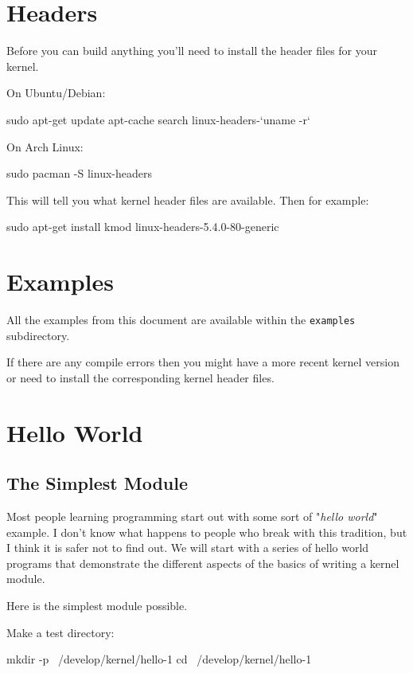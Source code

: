 \documentclass[10pt, oneside]{book}
\begin{document}
\section{Headers}
\label{sec:headers}
Before you can build anything you'll need to install the header files for your kernel.

On Ubuntu/Debian:
\begin{codebash}
sudo apt-get update
apt-cache search linux-headers-`uname -r`
\end{codebash}

On Arch Linux:
\begin{codebash}
sudo pacman -S linux-headers
\end{codebash}

This will tell you what kernel header files are available.
Then for example:
\begin{codebash}
sudo apt-get install kmod linux-headers-5.4.0-80-generic
\end{codebash}

\section{Examples}
\label{sec:examples}
All the examples from this document are available within the \verb|examples| subdirectory.

If there are any compile errors then you might have a more recent kernel version or need to install the corresponding kernel header files.

\section{Hello World}
\label{sec:helloworld}
\subsection{The Simplest Module}
\label{sec:org2d3e245}
Most people learning programming start out with some sort of "\emph{hello world}" example.
I don't know what happens to people who break with this tradition, but I think it is safer not to find out.
We will start with a series of hello world programs that demonstrate the different aspects of the basics of writing a kernel module.

Here is the simplest module possible.

Make a test directory:
\begin{codebash}
mkdir -p ~/develop/kernel/hello-1
cd ~/develop/kernel/hello-1
\end{codebash}
\end{document}
